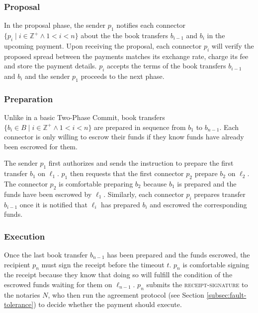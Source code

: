 \documentclass[letterpaper,twocolumn,10pt]{article}
\begin{document}
\subsubsection{Proposal}

In the proposal phase, the sender $p_1$ notifies each connector $ \{ p_i \mid i \in \mathbb{Z}^+ \land 1 < i < n \} $ about the the book transfers $b_{i-1}$ and $b_i$ in the upcoming payment. Upon receiving the proposal, each connector $p_i$ will verify the proposed spread between the payments matches its exchange rate, charge its fee and store the payment details. $p_i$ accepts the terms of the book transfers $b_{i-1}$ and $b_i$ and the sender $p_1$ proceeds to the next phase.

\subsubsection{Preparation}


Unlike in a basic Two-Phase Commit, book transfers 
$ \{ b_i \in B \mid i \in \mathbb{Z}^+ \land 1 < i < n \} $
are prepared in sequence from $b_1$ to $b_{n-1}$. Each connector is only willing to escrow their funds if they know funds have already been escrowed for them. 

The sender $p_1$ first authorizes and sends the instruction to prepare the first transfer $b_1$ on $\ell_1$. $p_1$ then requests that the first connector $p_2$ prepare $b_2$ on $\ell_2$. The connector $p_2$ is comfortable preparing $b_2$ because $b_1$ is prepared and the funds have been escrowed by $\ell_1$. Similarly, each connector $p_i$ prepares transfer $b_{i-1}$ once it is notified that $\ell_i$ has prepared $b_i$ and escrowed the corresponding funds.

\subsubsection{Execution}

Once the last book transfer $b_{n-1}$ has been prepared and the funds escrowed, the recipient $p_n$ must sign the receipt before the timeout $t$. $p_n$ is comfortable signing the receipt because they know that doing so will fulfill the condition of the escrowed funds waiting for them on $\ell_{n-1}$. $p_n$ submits the \textsc{receipt-signature} to the notaries $N$, who then run the agreement protocol (see Section \ref{subsec:fault-tolerance}) to decide whether the payment should execute.
\end{document}
